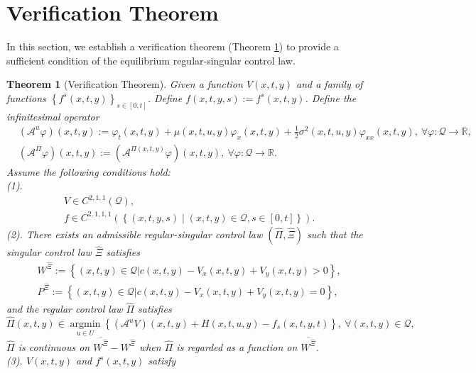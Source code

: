 \documentclass[11pt,reqno]{article}%
\newtheorem{theorem}{Theorem}[section]
\numberwithin{equation}{section}
\begin{document}
\section{Verification Theorem}\label{Verification theorem}
In this section, we establish a verification theorem (Theorem \ref{verificationthm}) to provide a sufficient condition of the equilibrium regular-singular control law.
\begin{theorem}[Verification Theorem]\label{verificationthm}
Given a function $V(x,t,y)$ and a family of functions $\left\{f^{s}(x,t,y)\right\}_{s\in[0,t]}$. Define $f(x,t,y,s):=f^{s}(x,t,y)$. Define the infinitesimal operator
\begin{equation}
\begin{aligned}
&\left(\mathcal{A}^{u}\varphi\right)(x,t,y):=\varphi_{t}(x,t,y)+\mu(x,t,u,y)\varphi_{x}(x,t,y)+\frac{1}{2}\sigma^{2}(x,t,u,y)\varphi_{xx}(x,t,y),\ \forall\varphi:\mathcal{Q}\rightarrow\mathbb{R},\\
&\left(\mathcal{A}^{\Pi}\varphi\right)(x,t,y):=\left(\mathcal{A}^{\Pi(x,t,y)}\varphi\right)(x,t,y),\ \forall\varphi:\mathcal{Q}\rightarrow\mathbb{R}.
\end{aligned}\nonumber
\end{equation} 
Assume the following conditions hold:\\
(1).
\begin{equation}
\begin{aligned}
& V \in C^{2,1,1}\left(\mathcal{Q}\right), \\
& f \in C^{2,1,1,1}\left(\left\{(x,t,y,s)\mid (x,t,y)\in\mathcal{Q}, s\in [0,t]\right\}\right).
\end{aligned}\nonumber
\end{equation}
(2). There exists an admissible regular-singular control law $\left(\hat{\Pi},\hat{\Xi}\right)$ such that the singular control law $\hat{\Xi}$ satisfies
\begin{equation}
\begin{aligned}
&W^{\hat{\Xi}}:=\left\{(x,t,y)\in\mathcal{Q}|c(x,t,y)-V_{x}(x,t,y)+V_{y}(x,t,y)>0\right\},\\
&P^{\hat{\Xi}}:=\left\{(x,t,y)\in\mathcal{Q}|c(x,t,y)-V_{x}(x,t,y)+V_{y}(x,t,y)=0\right\},
\end{aligned}\nonumber
\end{equation}
and the regular control law $\hat{\Pi}$ satisfies
\begin{equation}
\hat{\Pi}(x,t,y)\in\mathop{\mathrm{argmin}}\limits_{u\in U}\left\{\left(\mathcal{A}^{u}V\right)(x,t,y)+H(x,t,u,y)-f_s(x,t,y,t)\right\},\ \forall (x,t,y)\in\mathcal{Q},
\nonumber
\end{equation}
$\hat{\Pi}$ is continuous on $\overline{W^{\hat{\Xi}}}-W^{\hat{\Xi}}$ when $\hat{\Pi}$ is regarded as a function on $\overline{W^{\hat{\Xi}}}$. \\
(3). $V(x,t,y)$ and $f^{s}(x,t,y)$ satisfy


\end{theorem}
\end{document}
